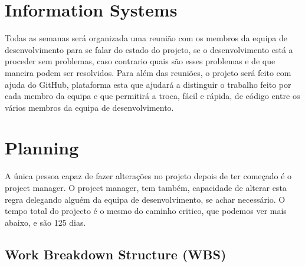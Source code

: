 \documentclass[a4paper]{article}
\begin{document}
\section{Information Systems}

Todas as semanas será organizada uma reunião com os membros da equipa de desenvolvimento para se falar do estado do projeto, se o desenvolvimento está a proceder sem problemas, caso contrario quais são esses problemas e de que maneira podem ser resolvidos. Para além das reuniões, o projeto será feito com ajuda do GitHub, plataforma esta que ajudará a distinguir o trabalho feito por cada membro da equipa e que permitirá a troca, fácil e rápida, de código entre os vários membros da equipa de desenvolvimento.

\section{Planning}
A única pessoa capaz de fazer alterações no projeto depois de ter começado é o project manager. O project manager, tem também, capacidade de alterar esta regra delegando alguém da equipa de desenvolvimento, se achar necessário. O tempo total do projecto é o mesmo do caminho critico, que podemos ver mais abaixo, e são 125 dias.

\subsection{Work Breakdown Structure (WBS)}

\end{document}
